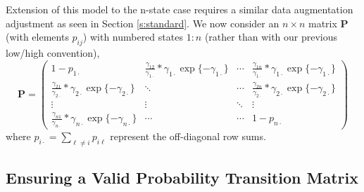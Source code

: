 \documentclass[cmbright,fleqn,referee]{envauth}
\begin{document}
Extension of this model to the n-state case requires a similar data augmentation adjustment as seen in Section \ref{s:standard}. We now consider an $n \times n$ matrix $\mathbf{P}$ (with elements $p_{ij}$) with numbered states $1:n$ (rather than with our previous low/high convention), 
\begin{equation}
\bm{P} = \begin{pmatrix}
1 - p_{1\cdot} & \frac{\gamma_{12}}{\gamma_{1 \cdot}} * \gamma_{1\cdot}\exp\{- \gamma_{1\cdot}\}  & \cdots &  \frac{\gamma_{1n}}{\gamma_{1 \cdot}} * \gamma_{1\cdot}\exp\{- \gamma_{1\cdot}\}  \\
 \frac{\gamma_{21}}{\gamma_{2 \cdot}} * \gamma_{2\cdot}\exp\{- \gamma_{2\cdot}\}  &  \ddots & \cdots & \frac{\gamma_{2n}}{\gamma_{2 \cdot}}  * \gamma_{2\cdot}\exp\{- \gamma_{2\cdot}\}  \\
\vdots & \vdots & \ddots & \vdots \\
 \frac{\gamma_{n1}}{\gamma_{n \cdot}}  * \gamma_{n\cdot}\exp\{- \gamma_{n\cdot}\}  & \cdots & \cdots & 1 - p_{n \cdot}
\end{pmatrix}
\label{e:nstatePTM}
\end{equation}
where $p_{i\cdot} = \sum_{\ell \neq i} p_{i\ell}$ represent the off-diagonal row sums.
\subsection{Ensuring a Valid Probability Transition Matrix}
\end{document}
